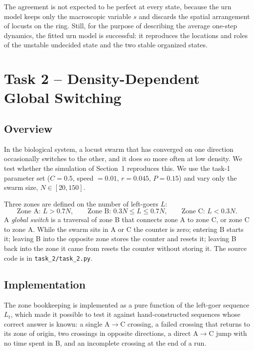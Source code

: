 \documentclass[12pt, a4paper]{article}
\begin{document}
The agreement is not expected to be perfect at every state, because the urn
model keeps only the macroscopic variable $s$ and discards the spatial
arrangement of locusts on the ring.  Still, for the purpose of describing the
average one-step dynamics, the fitted urn model is successful: it reproduces the
locations and roles of the unstable undecided state and the two stable organized
states.

\newpage
\section{Task 2 -- Density-Dependent Global Switching}

\subsection{Overview}

In the biological system, a locust swarm that has converged on one direction
occasionally switches to the other, and it does so more often at low density.
We test whether the simulation of Section~1 reproduces this.  We use the task-1
parameter set ($C = 0.5$, speed $= 0.01$, $r = 0.045$, $P = 0.15$) and vary only
the swarm size, $N \in [20, 150]$.

Three zones are defined on the number of left-goers $L$:
\[
    \text{Zone A: } L > 0.7N, \qquad
    \text{Zone B: } 0.3N \le L \le 0.7N, \qquad
    \text{Zone C: } L < 0.3N .
\]
A \emph{global switch} is a traversal of zone B that connects zone A to zone C,
or zone C to zone A.  While the swarm sits in A or C the counter is zero;
entering B starts it; leaving B into the opposite zone stores the counter and
resets it; leaving B back into the zone it came from resets the counter without
storing it.  The source code is in \texttt{task\_2/task\_2.py}.

\subsection{Implementation}

The zone bookkeeping is implemented as a pure function of the left-goer sequence
$L_t$, which made it possible to test it against hand-constructed sequences
whose correct answer is known: a single A$\to$C crossing, a failed crossing that
returns to its zone of origin, two crossings in opposite directions, a direct
A$\to$C jump with no time spent in B, and an incomplete crossing at the end of a
run.
\end{document}
